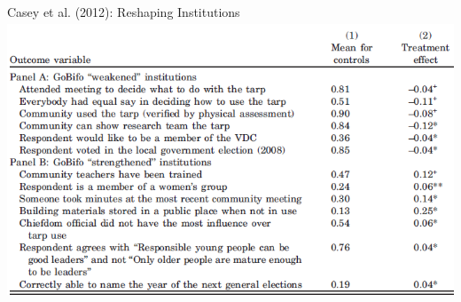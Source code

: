 \documentclass[aspectratio=169]{beamer}
\begin{document}
\usebackgroundtemplate{}
\begin{frame}{Casey et al. (2012): Reshaping Institutions}
\includegraphics[height=3.25in]{../Images/GoBifo1.PNG}
\end{frame}
\end{document}
